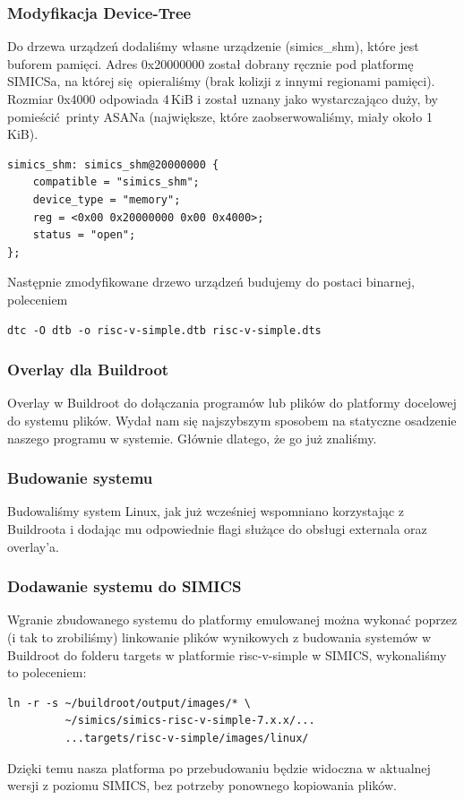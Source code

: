 \documentclass[../main.tex]{subfiles}
\begin{document}
\subsubsection{Modyfikacja Device-Tree}
	Do drzewa urządzeń dodaliśmy własne urządzenie (simics\_shm), które jest buforem pamięci.
	Adres 0x20000000 został dobrany ręcznie pod platformę SIMICSa, na której się opieraliśmy
	(brak kolizji z innymi regionami pamięci). Rozmiar 0x4000 odpowiada 4\,KiB i został uznany
	jako wystarczająco duży, by pomieścić printy ASANa (największe, które zaobserwowaliśmy,
	miały około 1\,KiB).
	\begin{listing}[H]
		\begin{verbatim}
simics_shm: simics_shm@20000000 {
	compatible = "simics_shm";
	device_type = "memory";
	reg = <0x00 0x20000000 0x00 0x4000>;
	status = "open";
};
		\end{verbatim}
	\end{listing}
	\noindent
	Następnie zmodyfikowane drzewo urządzeń budujemy do postaci binarnej, poleceniem
	
	\begin{listing}[H]
		\begin{verbatim}
dtc -O dtb -o risc-v-simple.dtb risc-v-simple.dts
		\end{verbatim}
	\end{listing}


\subsubsection{Overlay dla Buildroot}
Overlay w Buildroot do dołączania programów lub plików do platformy docelowej do systemu plików. Wydał nam się najszybszym sposobem na statyczne osadzenie naszego programu w systemie. Głównie dlatego, że go już znaliśmy.

\subsubsection{Budowanie systemu}
Budowaliśmy system Linux, jak już wcześniej wspomniano korzystając z Buildroota i dodając mu odpowiednie flagi służące do obsługi externala oraz overlay'a.

\subsubsection{Dodawanie systemu do SIMICS}
Wgranie zbudowanego systemu do platformy emulowanej można wykonać poprzez (i tak to zrobiliśmy) linkowanie plików wynikowych z budowania systemów w Buildroot do folderu targets w platformie risc-v-simple w SIMICS, wykonaliśmy to poleceniem:
	\begin{listing}[H]
		\begin{verbatim}
ln -r -s ~/buildroot/output/images/* \
         ~/simics/simics-risc-v-simple-7.x.x/...
         ...targets/risc-v-simple/images/linux/
		\end{verbatim}
	\end{listing}
\noindent
Dzięki temu nasza platforma po przebudowaniu będzie widoczna w aktualnej wersji z poziomu SIMICS, bez potrzeby ponownego kopiowania plików.
\end{document}
